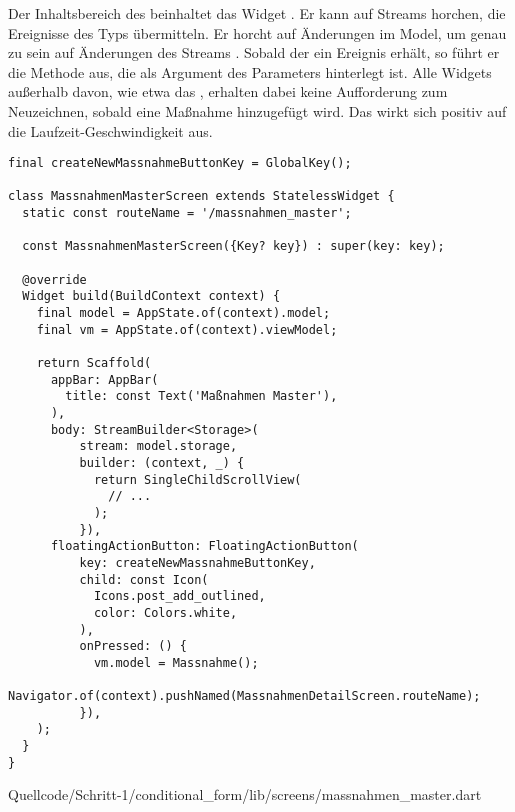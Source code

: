 Der Inhaltsbereich des  beinhaltet das Widget  .
Er kann auf Streams horchen, die Ereignisse des Typs  übermitteln.
Er horcht auf Änderungen im Model, um genau zu sein auf Änderungen des Streams  . Sobald der  ein Ereignis erhält, so führt er die Methode aus, die als Argument des Parameters  hinterlegt ist. Alle Widgets außerhalb davon, wie etwa das , erhalten dabei keine Aufforderung zum Neuzeichnen, sobald eine Maßnahme hinzugefügt wird. Das wirkt sich positiv auf die Laufzeit-Geschwindigkeit aus.


\ifincludeall
  \begin{listing}[htbp]
    \renewcommand\theFancyVerbLine{%
      \ifnum\value{FancyVerbLine}=31
      \setcounter{FancyVerbLine}{85}
      \tiny\ldots
      \else
      \tiny\arabic{FancyVerbLine}%
      \fi
    }
    \begin{verbatim}
final createNewMassnahmeButtonKey = GlobalKey();

class MassnahmenMasterScreen extends StatelessWidget {
  static const routeName = '/massnahmen_master';

  const MassnahmenMasterScreen({Key? key}) : super(key: key);

  @override
  Widget build(BuildContext context) {
    final model = AppState.of(context).model;
    final vm = AppState.of(context).viewModel;

    return Scaffold(
      appBar: AppBar(
        title: const Text('Maßnahmen Master'),
      ),
      body: StreamBuilder<Storage>(
          stream: model.storage,
          builder: (context, _) {
            return SingleChildScrollView(
              // ...
            );
          }),
      floatingActionButton: FloatingActionButton(
          key: createNewMassnahmeButtonKey,
          child: const Icon(
            Icons.post_add_outlined,
            color: Colors.white,
          ),
          onPressed: () {
            vm.model = Massnahme();
            Navigator.of(context).pushNamed(MassnahmenDetailScreen.routeName);
          }),
    );
  }
}
\end{verbatim}
     {Quellcode/Schritt-1/conditional_form/lib/screens/massnahmen_master.dart}
    \label{lst:Schritt1KlasseMassnahmenMasterScreenStruktur}
  \end{listing}
\fi

\ifincludeall \clearpage \fi
